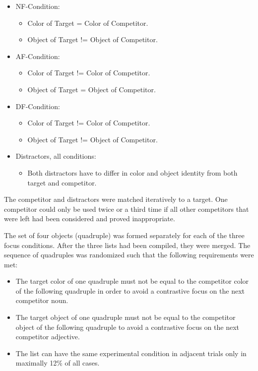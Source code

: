 \documentclass[
  12pt,
]{article}
\providecommand{\tightlist}{%
  \setlength{\itemsep}{0pt}\setlength{\parskip}{0pt}}
\begin{document}
\begin{itemize}
\tightlist
\item
  NF-Condition:

  \begin{itemize}
  \tightlist
  \item
    Color of Target = Color of Competitor.
  \item
    Object of Target != Object of Competitor.
  \end{itemize}
\item
  AF-Condition:

  \begin{itemize}
  \tightlist
  \item
    Color of Target != Color of Competitor.
  \item
    Object of Target = Object of Competitor.
  \end{itemize}
\item
  DF-Condition:

  \begin{itemize}
  \tightlist
  \item
    Color of Target != Color of Competitor.
  \item
    Object of Target != Object of Competitor.
  \end{itemize}
\item
  Distractors, all conditions:

  \begin{itemize}
  \tightlist
  \item
    Both distractors have to differ in color and object identity from both target and competitor.
  \end{itemize}
\end{itemize}

The competitor and distractors were matched iteratively to a target.
One competitor could only be used twice or a third time if all other competitors that were left had been considered and proved inappropriate.

The set of four objects (quadruple) was formed separately for each of the three focus conditions.
After the three lists had been compiled, they were merged.
The sequence of quadruples was randomized such that the following requirements were met:

\begin{itemize}
\tightlist
\item
  The target color of one quadruple must not be equal to the competitor color of the following quadruple in order to avoid a contrastive focus on the next competitor noun.
\item
  The target object of one quadruple must not be equal to the competitor object of the following quadruple to avoid a contrastive focus on the next competitor adjective.
\item
  The list can have the same experimental condition in adjacent trials only in maximally 12\% of all cases.
\end{itemize}
\end{document}
